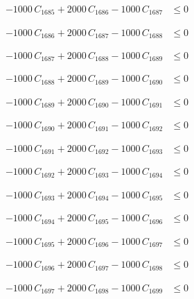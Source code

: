 \documentclass[a4paper,11pt]{article}
\begin{document}
\begin{align}
-1000\,C_{1685} + 2000\,C_{1686} - 1000\,C_{1687} &\leq 0 \nonumber
\end{align}

\begin{align}
-1000\,C_{1686} + 2000\,C_{1687} - 1000\,C_{1688} &\leq 0 \nonumber
\end{align}

\begin{align}
-1000\,C_{1687} + 2000\,C_{1688} - 1000\,C_{1689} &\leq 0 \nonumber
\end{align}

\begin{align}
-1000\,C_{1688} + 2000\,C_{1689} - 1000\,C_{1690} &\leq 0 \nonumber
\end{align}

\begin{align}
-1000\,C_{1689} + 2000\,C_{1690} - 1000\,C_{1691} &\leq 0 \nonumber
\end{align}

\begin{align}
-1000\,C_{1690} + 2000\,C_{1691} - 1000\,C_{1692} &\leq 0 \nonumber
\end{align}

\begin{align}
-1000\,C_{1691} + 2000\,C_{1692} - 1000\,C_{1693} &\leq 0 \nonumber
\end{align}

\begin{align}
-1000\,C_{1692} + 2000\,C_{1693} - 1000\,C_{1694} &\leq 0 \nonumber
\end{align}

\begin{align}
-1000\,C_{1693} + 2000\,C_{1694} - 1000\,C_{1695} &\leq 0 \nonumber
\end{align}

\begin{align}
-1000\,C_{1694} + 2000\,C_{1695} - 1000\,C_{1696} &\leq 0 \nonumber
\end{align}

\begin{align}
-1000\,C_{1695} + 2000\,C_{1696} - 1000\,C_{1697} &\leq 0 \nonumber
\end{align}

\begin{align}
-1000\,C_{1696} + 2000\,C_{1697} - 1000\,C_{1698} &\leq 0 \nonumber
\end{align}

\begin{align}
-1000\,C_{1697} + 2000\,C_{1698} - 1000\,C_{1699} &\leq 0 \nonumber
\end{align}
\end{document}
